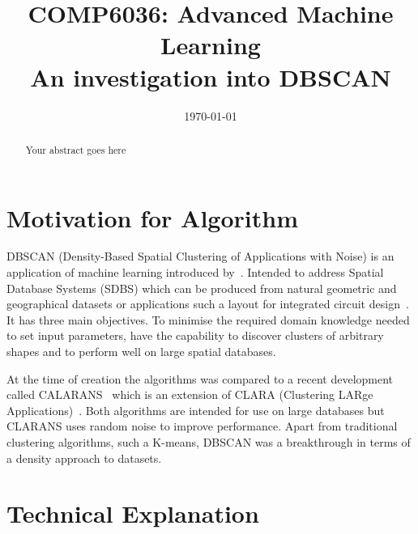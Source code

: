 \documentclass{ecsarticle}     %
\begin{document}
\frontmatter
\title      {COMP6036: Advanced Machine Learning\\[1cm]
            An investigation into DBSCAN}
      
\addresses  {\deptname\\\univname}

\date       {\today}
\subject    {}
\keywords   {}
\maketitle



\begin{abstract}
Your abstract goes here
\end{abstract}

\mainmatter


\section{Motivation for Algorithm}

DBSCAN (Density-Based Spatial Clustering of Applications with Noise) is an application of machine learning introduced by~\cite{ester96dbscan}.
Intended to address Spatial Database Systems (SDBS) which can be produced from natural geometric and geographical datasets or applications such a layout for integrated circuit design~\citep{guting94sdbs}.
It has three main objectives.
To minimise the required domain knowledge needed to set input parameters, have the capability to discover clusters of arbitrary shapes and to perform well on large spatial databases.

At the time of creation the algorithms was compared to a recent development called CALARANS~\citep{ng94clarans} which is an extension of CLARA (Clustering LARge Applications)~\citep{kaufman90clara}.
Both algorithms are intended for use on large databases but CLARANS uses random noise to improve performance.
Apart from traditional clustering algorithms, such a K-means, DBSCAN was a breakthrough in terms of a density approach to datasets.

\section{Technical Explanation}
\end{document}
